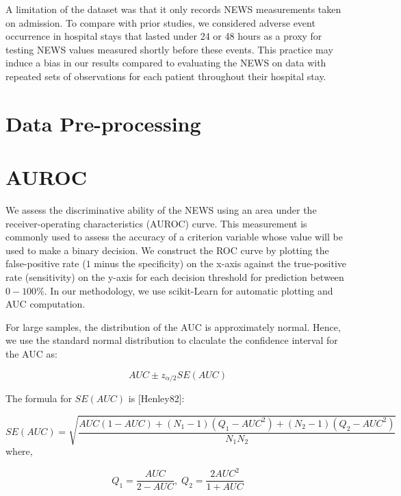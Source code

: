 \documentclass[10pt,journal, compsoc]{IEEEtran}
\begin{document}
A limitation of the dataset was that it only records NEWS measurements taken on admission. To compare with prior studies, we considered adverse event occurrence in hospital stays that lasted under 24 or 48 hours as a proxy for testing NEWS values measured shortly before these events. This practice may induce a bias in our results compared to evaluating the NEWS on data with repeated sets of observations for each patient throughout their hospital stay.


\printbibliography


\onecolumn
\appendices

\section{Data Pre-processing}
\label{appendix:preprocessing}

\section{AUROC}
\label{appendix:auroc}
We assess the discriminative ability of the NEWS using an area under the receiver-operating characteristics (AUROC) curve. This measurement is commonly used to assess the accuracy of a criterion variable whose value will be used to make a binary decision. We construct the ROC curve by plotting the false-positive rate ($1$ minus the specificity) on the x-axis against the true-positive rate (sensitivity) on the y-axis for each decision threshold for prediction between $0-100\%$. In our methodology, we use scikit-Learn for automatic plotting and AUC computation.

For large samples, the distribution of the AUC is approximately normal. Hence, we use the standard normal distribution to claculate the confidence interval for the AUC as:

\begin{equation}
    AUC \pm z_{\alpha/2}SE(AUC)
\end{equation}

The formula for $SE(AUC)$ is [Henley82]:

\begin{equation}
    SE(AUC) = \sqrt{\frac{AUC(1-AUC) + (N_1-1)(Q_1-AUC^2) + (N_2-1)(Q_2-AUC^2)}{N_1N_2}}
\end{equation}
where,

\begin{equation}
    Q_1 = \frac{AUC}{2-AUC}, \;
    Q_2 = \frac{2AUC^2}{1+AUC}
\end{equation}
\newpage
\end{document}
